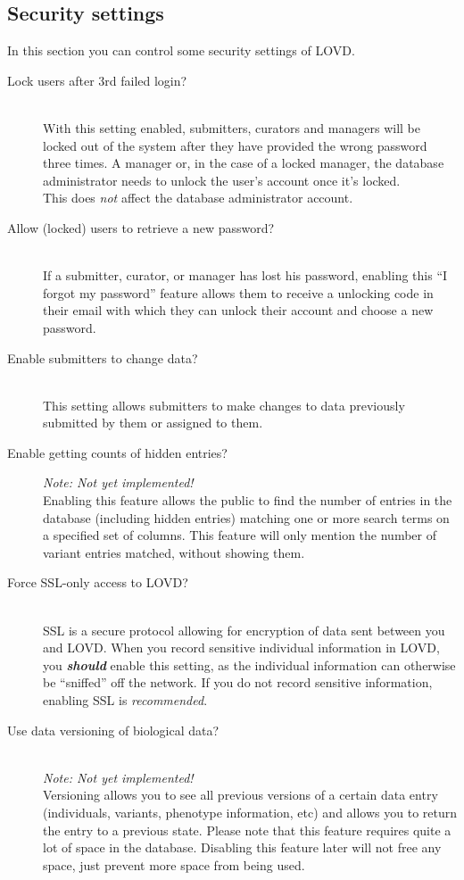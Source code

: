 \documentclass[a4paper,oneside,openany,12pt]{memoir}
\begin{document}
\hypertarget{ssec:security_settings}{}
\subsection{Security settings}
In this section you can control some security settings of LOVD.
\begin{description}
  \item[Lock users after 3rd failed login?] \hfill \\
  With this setting enabled, submitters, curators and managers will be locked out of the system after they have provided the wrong password three times.
  A manager or, in the case of a locked manager, the database administrator needs to unlock the user's account once it's locked.
  \\
  This does \emph{not} affect the database administrator account.
  \item[Allow (locked) users to retrieve a new password?] \hfill \\
  If a submitter, curator, or manager has lost his password, enabling this ``I forgot my password''
   feature allows them to receive a unlocking code in their email with which they can unlock their account and choose a new password.
  \item[Enable submitters to change data?] \hfill \\
  This setting allows submitters to make changes to data previously submitted by them or assigned to them.
  \item[Enable getting counts of hidden entries?] \hfill \par
  \emph{Note: Not yet implemented!}
  \\
  Enabling this feature allows the public to find the number of entries in the database
   (including hidden entries) matching one or more search terms on a specified set of columns.
  This feature will only mention the number of variant entries matched, without showing them.
  \item[Force SSL-only access to LOVD?] \hfill \\
  SSL is a secure protocol allowing for encryption of data sent between you and LOVD.
  When you record sensitive individual information in LOVD, you \emph{\textbf{should}} enable this setting,
   as the individual information can otherwise be ``sniffed'' off the network.
  If you do not record sensitive information, enabling SSL is \emph{recommended}.
  \item[Use data versioning of biological data?] \hfill \\
  \emph{Note: Not yet implemented!}
  \\
  Versioning allows you to see all previous versions of a certain data entry (individuals, variants,
   phenotype information, etc) and allows you to return the entry to a previous state.
  Please note that this feature requires quite a lot of space in the database.
  Disabling this feature later will not free any space, just prevent more space from being used.
\end{description}
\end{document}
